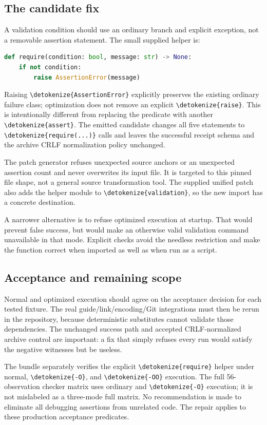 \documentclass[11pt,letterpaper]{article}
\newcommand{\code}[1]{\expandafter\nolinkurl\expandafter{\detokenize{#1}}}
\begin{document}
\subsection{The candidate fix}

A validation condition should use an ordinary branch and explicit exception, not a removable assertion statement. The small supplied helper is:
\begin{lstlisting}[language=Python]
def require(condition: bool, message: str) -> None:
    if not condition:
        raise AssertionError(message)
\end{lstlisting}

Raising \code{AssertionError} explicitly preserves the existing ordinary failure class; optimization does not remove an explicit \code{raise}. This is intentionally different from replacing the predicate with another \code{assert}. The emitted candidate changes all five statements to \code{require(...)} calls and leaves the successful receipt schema and the archive CRLF normalization policy unchanged.

The patch generator refuses unexpected source anchors or an unexpected assertion count and never overwrites its input file. It is targeted to this pinned file shape, not a general source transformation tool. The supplied unified patch also adds the helper module to \code{validation}, so the new import has a concrete destination.

A narrower alternative is to refuse optimized execution at startup. That would prevent false success, but would make an otherwise valid validation command unavailable in that mode. Explicit checks avoid the needless restriction and make the function correct when imported as well as when run as a script.

\subsection{Acceptance and remaining scope}

Normal and optimized execution should agree on the acceptance decision for each tested fixture. The real guide/link/encoding/Git integrations must then be rerun in the repository, because deterministic substitutes cannot validate those dependencies. The unchanged success path and accepted CRLF-normalized archive control are important: a fix that simply refuses every run would satisfy the negative witnesses but be useless.

The bundle separately verifies the explicit \code{require} helper under normal, \code{-O}, and \code{-OO} execution. The full 56-observation checker matrix uses ordinary and \code{-O} execution; it is not mislabeled as a three-mode full matrix. No recommendation is made to eliminate all debugging assertions from unrelated code. The repair applies to these production acceptance predicates.
\end{document}
